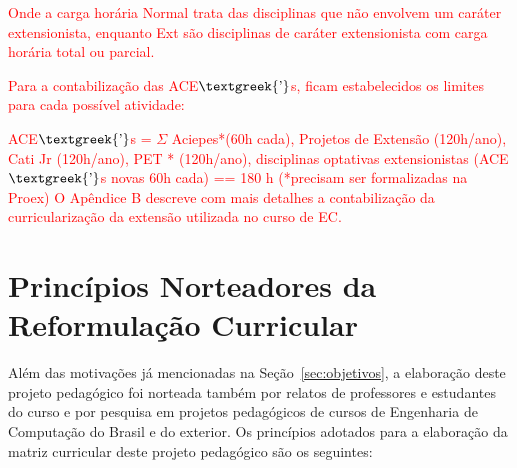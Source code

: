 \textcolor{red}{Onde a carga horária Normal trata das disciplinas que não envolvem um caráter extensionista, enquanto Ext são disciplinas de caráter extensionista com carga horária total ou parcial.}

\textcolor{red}{Para a contabilização das ACE$\text{\textgreek{’}}$s, ficam estabelecidos os limites para cada possível atividade:}

\textcolor{red}{ACE$\text{\textgreek{’}}$s = $\Sigma $ Aciepes*(60h cada), Projetos de Extensão (120h/ano), Cati Jr (120h/ano), PET%
* (120h/ano), disciplinas optativas extensionistas (ACE$\text{\textgreek{’}}$s novas 60h cada) == 180 h  (*precisam ser formalizadas na Proex)
}
\textcolor{red}{O Apêndice B descreve com mais detalhes a contabilização da curricularização da extensão utilizada no curso de EC.}

\section{Princípios Norteadores da Reformulação Curricular}

Além das motivações já mencionadas na Seção~\ref{sec:objetivos}, a elaboração deste projeto pedagógico foi norteada também por relatos de professores e estudantes do curso e por pesquisa em projetos pedagógicos de cursos de Engenharia de Computação do Brasil e do exterior. Os princípios adotados para a elaboração da matriz curricular deste projeto pedagógico são os seguintes:

